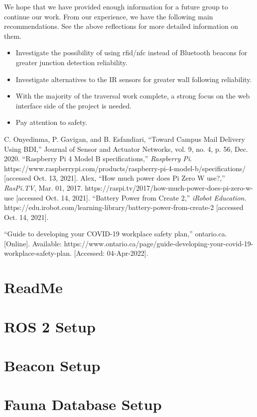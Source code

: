 \documentclass[12pt]{report}
\begin{document}
We hope that we have provided enough information for a future group to continue our work. From our experience, we have the following main recommendations. See the above reflections for more detailed information on them.

\begin{itemize}
    \item Investigate the possibility of using rfid/nfc instead of Bluetooth beacons for greater junction detection reliability.
    \item Investigate alternatives to the IR sensors for greater wall following reliability.
    \item With the majority of the traversal work complete, a strong focus on the web interface side of the project is needed.
    \item Pay attention to safety.
\end{itemize}




\renewcommand{\bibname}{References}
\begin{thebibliography}{AAA}
 C. Onyedinma, P. Gavigan, and B. Esfandiari, “Toward Campus Mail Delivery Using BDI,” Journal of Sensor and Actuator Networks, vol. 9, no. 4, p. 56, Dec. 2020.
 “Raspberry Pi 4 Model B specifications,” {\em Raspberry Pi}. https://www.raspberrypi.com/products/raspberry-pi-4-model-b/specifications/ [accessed Oct. 13, 2021].
 Alex, “How much power does Pi Zero W use?,” {\em RasPi.TV}, Mar. 01, 2017. https://raspi.tv/2017/how-much-power-does-pi-zero-w-use [accessed Oct. 14, 2021].
 “Battery Power from Create 2,” {\em iRobot Education}. https://edu.irobot.com/learning-library/battery-power-from-create-2 [accessed Oct. 14, 2021].

“Guide to developing your COVID-19 workplace safety plan,” ontario.ca. [Online]. Available: https://www.ontario.ca/page/guide-developing-your-covid-19-workplace-safety-plan. [Accessed: 04-Apr-2022].
\end{thebibliography}
%    
%    
    \addcontentsline{toc}{chapter}{\bibname}
    

\appendix
\chapter{ReadMe}

\chapter{ROS 2 Setup}

\chapter{Beacon Setup}

\chapter{Fauna Database Setup}

\end{document}

